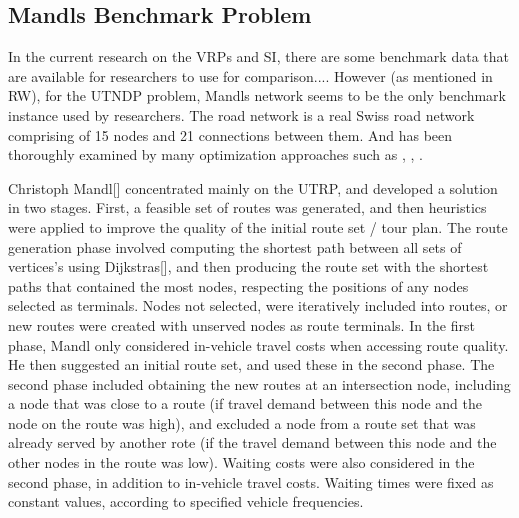 \subsection{Mandls Benchmark Problem}
In the current research on the VRPs and SI, there are some benchmark data that are available for researchers to use for comparison.... However (as mentioned in RW), for the UTNDP problem, Mandls network seems to be the only benchmark instance used by researchers. The road network is a real Swiss road network comprising of 15 nodes and 21 connections between them. And has been thoroughly examined by many optimization approaches such as \citep{kechagiopoulos14}, \citep{fan09}, \citep{nikolic14}. %

Christoph Mandl[] concentrated mainly on the UTRP, and developed a solution in two stages. First, a feasible set of routes was generated, and then heuristics were applied to improve the quality of the initial route set / tour plan. The route generation phase involved computing the shortest path between all sets of vertices's using Dijkstras[], and then producing the route set with the shortest paths that contained the most nodes, respecting the positions of any nodes selected as terminals. Nodes not selected, were iteratively included into routes, or new routes were created with unserved nodes as route terminals. In the first phase, Mandl only considered in-vehicle travel costs when accessing route quality. He then suggested an initial route set, and used these in the second phase. The second phase included obtaining the new routes at an intersection node, including a node that was close to a route (if travel demand between this node and the node on the route was high), and excluded a node from a route set that was already served by another rote (if the travel demand between this node and the other nodes in the route was low). Waiting costs were also considered in the second phase, in addition to in-vehicle travel costs. Waiting times were fixed as constant values, according to specified vehicle frequencies. 




